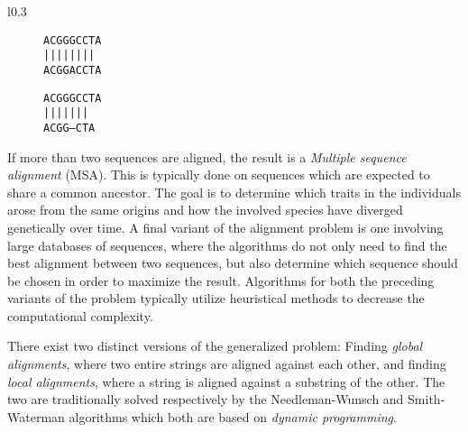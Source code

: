 \documentclass[thesis.tex]{subfiles}
\begin{document}
\setlength{\intextsep}{0mm}
\begin{wrapfigure}[15]{l}{0.3\textwidth}
  \begin{mdframed}
    \begin{subfigure}[t]{\textwidth}
      \begin{mdframed}
        \begin{center}
          \texttt{ACGGGCCTA}\\
          \texttt{||||\space||||}\\
          \texttt{ACGGACCTA}
        \end{center}
      \end{mdframed}
      \captionsetup{skip=-8pt}
    \end{subfigure}
    \begin{subfigure}[b]{\textwidth}
      \begin{mdframed}
        \begin{center}
          \texttt{ACGGGCCTA}\\
          \texttt{||||\space\space|||}\\
          \texttt{ACGG---CTA}
        \end{center}
      \end{mdframed}
      \captionsetup{skip=-8pt}
      \label{fig:gap_example}
    \end{subfigure}
  \end{mdframed}
  \vspace*{-5mm}
  \caption[Examples of aligned text strings]{}
  \label{fig:alignments}
\end{wrapfigure}
If more than two sequences are aligned, the result is a \textit{Multiple sequence alignment} (MSA). This is typically done on sequences which are expected to share a common ancestor. The goal is to determine which traits in the individuals arose from the same origins and how the involved species have diverged genetically over time. A final variant of the alignment problem is one involving large databases of sequences, where the algorithms do not only need to find the best alignment between two sequences, but also determine which sequence should be chosen in order to maximize the result. Algorithms for both the preceding variants of the problem typically utilize heuristical methods to decrease the computational complexity.\\
\par\noindent
There exist two distinct versions of the generalized problem: Finding \textit{global alignments}, where two entire strings are aligned against each other, and finding \textit{local alignments}, where a string is aligned against a substring of the other. The two are traditionally solved respectively by the Needleman-Wunsch and Smith-Waterman algorithms which both are based on \textit{dynamic programming}.
\end{document}
